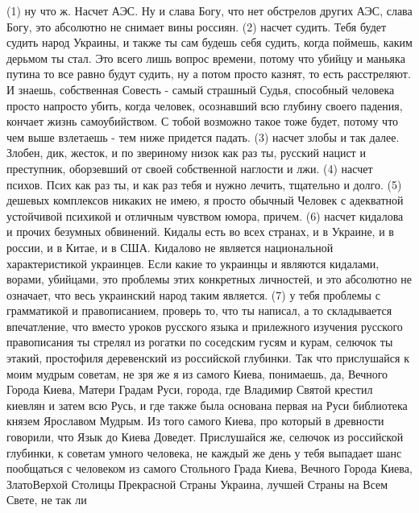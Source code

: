  
 
 
 
 

(1) ну что ж. Насчет АЭС. Ну и слава Богу, что нет обстрелов других АЭС, слава
Богу, это абсолютно не снимает вины россиян. (2) насчет судить. Тебя будет
судить народ Украины, и также ты сам будешь себя судить, когда поймешь, каким
дерьмом ты стал. Это всего лишь вопрос времени, потому что убийцу и маньяка
путина то все равно будут судить, ну а потом просто казнят, то есть
расстреляют. И знаешь, собственная Совесть - самый страшный Судья, способный
человека просто напросто убить, когда человек, осознавший всю глубину своего
падения, кончает жизнь самоубийством. С тобой возможно такое тоже будет, потому
что чем выше взлетаешь - тем ниже придется падать. (3) насчет злобы и так
далее. Злобен, дик, жесток, и по звериному низок как раз ты, русский нацист и
преступник, оборзевший от своей собственной наглости и лжи. (4) насчет психов.
Псих как раз ты, и как раз тебя и нужно лечить, тщательно и долго. (5) дешевых
комплексов никаких не имею, я просто обычный Человек с адекватной устойчивой
психикой и отличным чувством юмора, причем. (6) насчет кидалова и прочих
безумных обвинений. Кидалы есть во всех странах, и в Украине, и в россии, и в
Китае, и в США. Кидалово не является национальной характеристикой украинцев.
Если какие то украинцы и являются кидалами, ворами, убийцами, это проблемы этих
конкретных личностей, и это абсолютно не означает, что весь украинский народ
таким является. (7) у тебя проблемы с грамматикой и правописанием, проверь то,
что ты написал, а то складывается впечатление, что вместо уроков русского языка
и прилежного изучения русского правописания ты стрелял из рогатки по соседским
гусям и курам, селючок ты этакий, простофиля деревенский из российской
глубинки. Так что прислушайся к моим мудрым советам, не зря же я из самого
Киева, понимаешь, да, Вечного Города Киева, Матери Градам Руси, города, где
Владимир Святой крестил киевлян и затем всю Русь, и где также была основана
первая на Руси библиотека князем Ярославом Мудрым. Из того самого Киева, про
который в древности говорили, что Язык до Киева Доведет. Прислушайся же,
селючок из российской глубинки, к советам умного человека, не каждый же день у
тебя выпадает шанс пообщаться с человеком из самого Стольного Града Киева,
Вечного Города Киева, ЗлатоВерхой Столицы Прекрасной Страны Украина, лучшей
Страны на Всем Свете, не так ли

